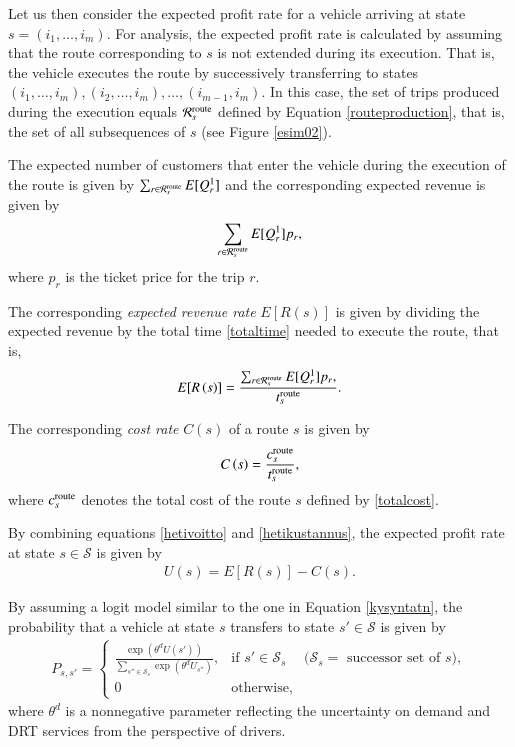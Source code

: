 \documentclass[dissertation,draft*]{aaltoseries}
\begin{document}
Let us then consider the expected profit rate for a vehicle 
arriving at state $s=(i_1,\ldots,i_m)$. For analysis, the expected profit rate is calculated
by assuming that the 
route corresponding to $s$ is not extended during its execution. 
That is, the vehicle executes the route by successively transferring to 
states $(i_1,\ldots,i_m),(i_2,\ldots,i_m),\ldots,(i_{m-1},i_m)$.
In this case, the    
set of trips produced during the execution equals
$\mathcal{R}_{s}^{\rm route}$ defined by Equation \eqref{routeproduction}, that is, the
set of all subsequences of $s$ (see Figure \ref{esim02}).

The expected number of customers that enter the vehicle
during the execution of the route is given by $\sum_{r \in \mathcal{R}_{s}^{\rm route}} E[Q_{r}^1]$
and the corresponding expected revenue is given by 
\begin{align*}
\sum_{r \in \mathcal{R}_{s}^{\rm route}} E[Q_{r}^1] p_r,
\end{align*}
where $p_r$ is the ticket price for the trip $r$.

The corresponding \emph{expected revenue rate} $E[R\left(s \right)]$ is given by dividing the 
expected revenue by the total time \eqref{totaltime} needed to execute the route, that is,
\begin{align}
\label{hetivoitto}
E[R\left( s \right)] 
= \frac{\sum_{r \in \mathcal{R}_{s}^{\rm route}} E[Q_{r}^1] p_r,}{t_{s}^{\rm route}}.
\end{align}

The corresponding \emph{cost rate} $C(s)$ 
of a route $s$ is given by
\begin{align}
\label{hetikustannus}
C\left(s\right) = \frac{c_{s}^{\rm route}}{t_{s}^{\rm route}},
\end{align}
where $c_{s}^{\rm route}$ denotes the total cost of the route $s$ defined by \eqref{totalcost}.

By combining equations \eqref{hetivoitto} and \eqref{hetikustannus}, 
the expected profit rate at state $s \in \mathcal{S}$
is given by
\begin{align}
\label{profitrate}
U\left(s\right) = E[R(s)] - C(s).
\end{align}

By assuming a logit model similar to the one in Equation \eqref{kysyntatn},
the probability that a vehicle at state $s$ transfers to state $s' \in \mathcal{S}$
is given by
\begin{align}
\label{transitionprobability}
P_{s,s'} = 
\left\{
\begin{array}{llr}
\frac{\exp(\theta^d U(s'))}{\sum_{s'' \in \mathcal{S}_{s}} \exp(\theta^d U_{s''})}, 
& \mbox{if } s' \in \mathcal{S}_s & (\mathcal{S}_s = \mbox{ successor set of $s$)}, \\
0 & \mbox{otherwise},&
\end{array}
\right.
\end{align}
where $\theta^d$ is a 
nonnegative parameter reflecting the uncertainty on
demand and DRT services from the perspective of drivers.
\end{document}
